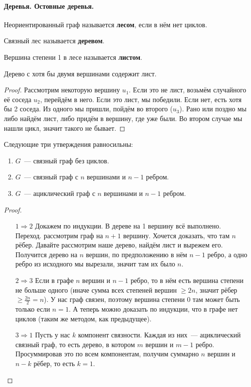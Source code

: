 \documentclass{article}
\begin{document}
    \paragraph{Деревья. Остовные деревья.}
    \begin{definition}
        Неориентированный граф называется \textbf{лесом}, если в нём нет циклов.
    \end{definition}
    \begin{definition}
        Связный лес называется \textbf{деревом}.
    \end{definition}
    \begin{definition}
        Вершина степени 1 в лесе называется \textbf{листом}.
    \end{definition}
    \begin{lemma}
        Дерево с хотя бы двумя вершинами содержит лист.
    \end{lemma}
    \begin{proof}
        Рассмотрим некоторую вершину $u_1$. Если это не лист, возьмём случайного её соседа $u_2$, перейдём в него. Если это лист, мы победили. Если нет, есть хотя бы 2 соседа. Из одного мы пришли, пойдём во второго ($u_3$). Рано или поздно мы либо найдём лист, либо придём в вершину, где уже были. Во втором случае мы нашли цикл, значит такого не бывает.
    \end{proof}
    \begin{theorem}
        Следующие три утверждения равносильны:
        \begin{enumerate}
            \item $G$~--- связный граф без циклов.
            \item $G$~--- связный граф с $n$ вершинами и $n-1$ ребром.
            \item $G$~--- ациклический граф с $n$ вершинами и $n-1$ ребром.
        \end{enumerate}
    \end{theorem}
    \begin{proof}
        \begin{itemize}
            \item[$1\Rightarrow2$] Докажем по индукции. В дереве на 1 вершину всё выполнено. Переход. рассмотрим граф на $n+1$ вершину. Хочется доказать, что там $n$ рёбер. Давайте рассмотрим наше дерево, найдём лист и вырежем его. Получится дерево на $n$ вершин, по предположению в нём $n-1$ ребро, а одно ребро из исходного мы вырезали, значит там их было $n$.
            \item[$2\Rightarrow3$] Если в графе $n$ вершин и $n-1$ ребро, то в нём есть вершина степени не больше одного (иначе сумма всех степеней вершин $\geqslant 2n$, значит рёбер $\geqslant\frac{2n}2=n$). У нас граф связен, поэтому вершина степени 0 там может быть только если $n=1$. А теперь можно доказать по индукции, что в графе нет циклов (таким же методом, как предыдущее).
            \item[$3\Rightarrow1$] Пусть у нас $k$ компонент связности. Каждая из них~--- ациклический связный граф, то есть дерево, в котором $m$ вершин и $m-1$ ребро. Просуммировав это по всем компонентам, получим суммарно $n$ вершин и $n-k$ рёбер, то есть $k=1$.
        \end{itemize}
    \end{proof}
\end{document}
